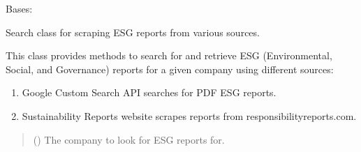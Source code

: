 \documentclass[letterpaper,10pt,english]{sphinxmanual}
\begin{document}
\begin{fulllineitems}
\label{\detokenize{src.esg_reports:src.esg_reports.search.Search}}
\pysigstartsignatures
\pysiglinewithargsret
{}
{\sphinxparamcomma {}}
{}
\pysigstopsignatures
\sphinxAtStartPar
Bases: 

\sphinxAtStartPar
Search class for scraping ESG reports from various sources.

\sphinxAtStartPar
This class provides methods to search for and retrieve ESG (Environmental, Social, and Governance)
reports for a given company using different sources:
\begin{enumerate}
%
\item {} 
\sphinxAtStartPar
Google Custom Search API \sphinxhyphen{} searches for PDF ESG reports.

\item {} 
\sphinxAtStartPar
Sustainability Reports website \sphinxhyphen{} scrapes reports from responsibilityreports.com.

\end{enumerate}
\begin{quote}\begin{description}
\sphinxAtStartPar
{} ({\hyperref[\detokenize{src.data_models:src.data_models.company.Company}]{}}) \textendash{} The company to look for ESG reports for.

\end{description}\end{quote}


\end{fulllineitems}
\end{document}
